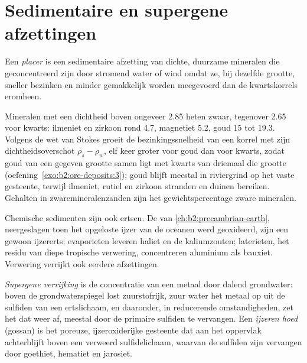 \section{Sedimentaire en supergene afzettingen}\label{sec:b2:ore-deposits:sedimentary}

\begin{definition}[Placer]\label{def:b2:ore-deposits:placer}
Een \emph{placer} is een sedimentaire afzetting van dichte, duurzame mineralen die geconcentreerd zijn door
stromend water of wind omdat ze, bij dezelfde grootte, sneller bezinken en minder gemakkelijk worden meegevoerd
dan de kwartskorrels eromheen.
\end{definition}

Mineralen met een dichtheid boven ongeveer 2.85 heten zwaar, tegenover 2.65 voor kwarts: ilmeniet en zirkoon
rond 4.7, magnetiet 5.2, goud 15 tot 19.3. Volgens de wet van Stokes groeit de bezinkingssnelheid van een korrel met
zijn dichtheidsoverschot $\rho_s - \rho_w$, elf keer groter voor goud dan voor kwarts, zodat goud van een
gegeven grootte samen ligt met kwarts van driemaal die grootte (oefening~\ref{exo:b2:ore-deposits:3}); goud
blijft meestal in riviergrind op het vaste gesteente, terwijl ilmeniet, rutiel en zirkoon stranden en
duinen bereiken. Gehalten in zwaremineralenzanden zijn het gewichtspercentage zware mineralen.

Chemische sedimenten zijn ook ertsen. De  van \cref{ch:b2:precambrian-earth},
neergeslagen toen het opgeloste ijzer van de oceanen werd geoxideerd, zijn een gewoon ijzererts; evaporieten
leveren haliet en de kaliumzouten; laterieten, het residu van diepe tropische verwering,
concentreren aluminium als bauxiet. Verwering verrijkt ook eerdere afzettingen.

\begin{definition}\label{def:b2:ore-deposits:supergene}
\emph{Supergene verrijking} is de concentratie van een metaal door
dalend grondwater: boven de grondwaterspiegel lost zuurstofrijk, zuur water het metaal op uit de
sulfiden van een ertslichaam, en daaronder, in reducerende omstandigheden, zet het dat weer af, meestal door
de primaire sulfiden te vervangen. Een \emph{ijzeren hoed} (gossan) is het poreuze, ijzeroxiderijke gesteente
dat aan het oppervlak achterblijft boven een verweerd sulfidelichaam, waarvan de sulfiden zijn vervangen door goethiet, hematiet en
jarosiet.
\end{definition}

